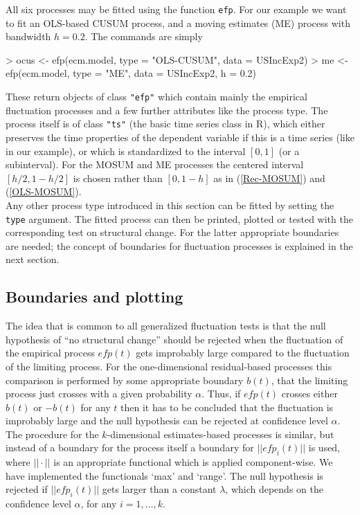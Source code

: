 \documentclass[10pt,a4paper]{article}
\begin{document}
All six processes may be fitted using the function {\tt efp}.
For our example we want to fit an OLS-based CUSUM process, and a moving
estimates (ME) process with bandwidth $h = 0.2$. The commands are simply
\begin{Schunk}
\begin{Sinput}
> ocus <- efp(ecm.model, type = "OLS-CUSUM", data = USIncExp2)
> me <- efp(ecm.model, type = "ME", data = USIncExp2, h = 0.2)
\end{Sinput}
\end{Schunk}
These return objects of class {\tt "efp"} which contain mainly the
empirical fluctuation processes and a few further attributes like the process
type. The process itself is of class {\tt "ts"} (the basic time series class in
\textsf{R}), which either preserves the time
properties of the dependent variable if this is a time series (like in our
example), or which is standardized to the interval $[0,1]$ (or a
subinterval). For the MOSUM and ME processes the centered interval $[h/2,
1-h/2]$ is chosen rather than $[0,1-h]$ as in (\ref{Rec-MOSUM}) and
(\ref{OLS-MOSUM}).\\

Any other process type introduced in this section can be fitted by setting the
{\tt type} argument. The fitted process can then be printed, plotted or tested
with the corresponding test on structural change. For the latter appropriate
boundaries are needed; the concept of boundaries for fluctuation processes is
explained in the next section.

\subsection{Boundaries and plotting}

The idea that is common to all generalized fluctuation tests is that the null
hypothesis of ``no structural change'' should be rejected when the fluctuation
of the empirical process $\mathit{efp}(t)$ gets improbably large compared to the
fluctuation of the limiting process. For the one-dimensional residual-based
processes this comparison is performed by some appropriate boundary $b(t)$, that
the limiting process just crosses with a given probability $\alpha$. Thus, if
$\mathit{efp}(t)$ crosses either $b(t)$ or $-b(t)$ for any $t$ then it has to be
concluded that the fluctuation is improbably large and the null hypothesis can
be rejected at confidence level $\alpha$. The procedure for the $k$-dimensional
estimates-based processes is similar, but instead of a boundary for the process
itself a boundary for $||\mathit{efp}_i(t)||$ is used,
where $||\cdot||$ is an appropriate functional which is applied component-wise.
We have implemented the functionals `max' and `range'. The null hypothesis is
rejected if $||\mathit{efp}_i(t)||$ gets larger than a constant $\lambda$, which
depends on the confidence level $\alpha$, for any $i = 1, \dots, k$.\\
\end{document}
